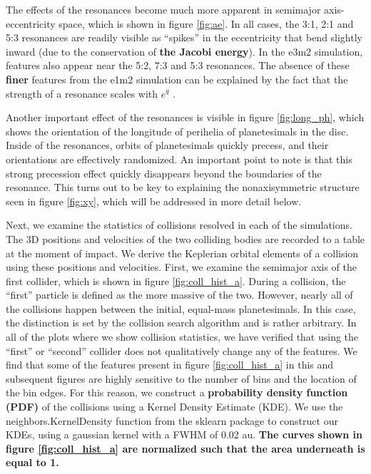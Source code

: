 \documentclass[fleqn,usenatbib]{mnras}
\begin{document}
The effects of the resonances become much more apparent in semimajor axis-eccentricity space, which is shown in figure \ref{fig:ae}. In all cases, 
the 3:1, 2:1 and 5:3 resonances are readily visible as ``spikes'' in the eccentricity that bend slightly inward (due to the conservation of \textbf{the Jacobi energy}). In the 
e3m2 simulation, features also appear near the 5:2, 7:3 and 5:3 resonances. The absence of these \textbf{finer} features from the e1m2 simulation can be 
explained by the fact that the strength of a resonance scales with $e^{q}$ \citep{1994PhyD...77..289M}.

Another important effect of the resonances is visible in figure \ref{fig:long_ph}, which shows the orientation of the longitude of perihelia of 
planetesimals in the disc. Inside of the resonances, orbits of planetesimals quickly precess, and their orientations are effectively randomized. An 
important point to note is that this strong precession effect quickly disappears beyond the boundaries of the resonance. This turns out to be 
key to explaining the nonaxisymmetric structure seen in figure \ref{fig:xy}, which will be addressed in more detail below.

Next, we examine the statistics of collisions resolved in each of the simulations. The 3D positions and velocities of the two colliding bodies are 
recorded to a table at the moment of impact. We derive the Keplerian orbital elements of a collision using these positions and velocities. 
First, we examine the semimajor axis of the first collider, which is shown in figure \ref{fig:coll_hist_a}. During a collision, the ``first'' particle is defined 
as the more massive of the two. However, nearly all of the collisions happen between the initial, equal-mass planetesimals. In this case, the 
distinction is set by the collision search algorithm and is rather arbitrary. In all of the plots where we show collision statistics, we have verified that 
using the ``first'' or ``second'' collider does not qualitatively change any of the features. We find that some of the features present in figure 
\ref{fig:coll_hist_a} in this and subsequent figures are highly sensitive to the number of bins and the location of the bin edges. For this reason, we 
construct a \textbf{probability density function (PDF)} of the collisions using a Kernel Density Estimate (KDE). We use the {\sc neighbors.KernelDensity} function from the {\sc sklearn} 
\citep{scikit-learn} package to construct our KDEs, using a gaussian kernel with a FWHM of 0.02 au. \textbf{The curves shown in figure \ref{fig:coll_hist_a} are normalized such that the 
area underneath is equal to 1.}
\end{document}
